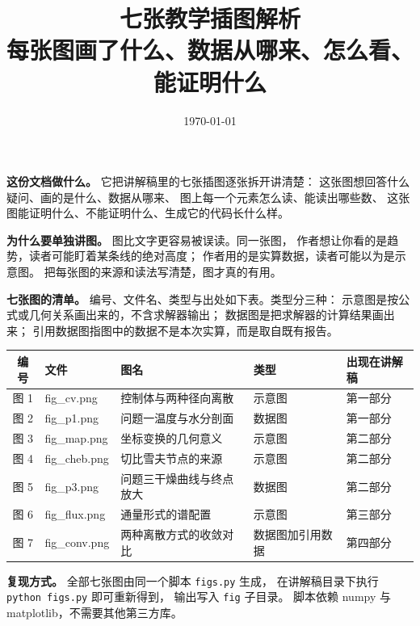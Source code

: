 \documentclass[11pt,a4paper]{article}
\title{\bfseries 七张教学插图解析\\[6pt]
\large 每张图画了什么、数据从哪来、怎么看、能证明什么}
\author{}
\date{\today}
\begin{document}
\maketitle
\thispagestyle{empty}

\vspace{0.6em}
\noindent
\textbf{这份文档做什么。}
它把讲解稿里的七张插图逐张拆开讲清楚：
这张图想回答什么疑问、画的是什么、数据从哪来、
图上每一个元素怎么读、能读出哪些数、
这张图能证明什么、不能证明什么、生成它的代码长什么样。

\vspace{4pt}
\noindent
\textbf{为什么要单独讲图。}
图比文字更容易被误读。同一张图，
作者想让你看的是趋势，读者可能盯着某条线的绝对高度；
作者用的是实算数据，读者可能以为是示意图。
把每张图的来源和读法写清楚，图才真的有用。

\vspace{4pt}
\noindent
\textbf{七张图的清单。}
编号、文件名、类型与出处如下表。类型分三种：
示意图是按公式或几何关系画出来的，不含求解器输出；
数据图是把求解器的计算结果画出来；
引用数据图指图中的数据不是本次实算，而是取自既有报告。

\begin{center}
\small
\begin{tabular}{@{}cllll@{}}
\toprule
编号 & 文件 & 图名 & 类型 & 出现在讲解稿 \\
\midrule
图 1 & fig\_cv.png & 控制体与两种径向离散 & 示意图 & 第一部分 \\
图 2 & fig\_p1.png & 问题一温度与水分剖面 & 数据图 & 第一部分 \\
图 3 & fig\_map.png & 坐标变换的几何意义 & 示意图 & 第二部分 \\
图 4 & fig\_cheb.png & 切比雪夫节点的来源 & 示意图 & 第二部分 \\
图 5 & fig\_p3.png & 问题三干燥曲线与终点放大 & 数据图 & 第二部分 \\
图 6 & fig\_flux.png & 通量形式的谱配置 & 示意图 & 第三部分 \\
图 7 & fig\_conv.png & 两种离散方式的收敛对比 & 数据图加引用数据 & 第四部分 \\
\bottomrule
\end{tabular}
\end{center}

\vspace{4pt}
\noindent
\textbf{复现方式。}
全部七张图由同一个脚本 \texttt{figs.py} 生成，
在讲解稿目录下执行 \texttt{python figs.py} 即可重新得到，
输出写入 \texttt{fig} 子目录。
脚本依赖 numpy 与 matplotlib，不需要其他第三方库。
\end{document}
